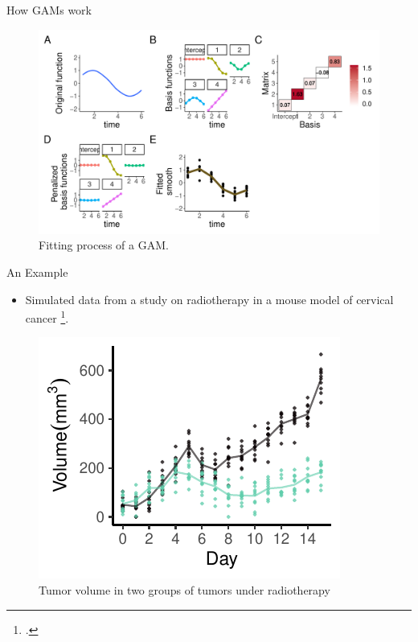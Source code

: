\documentclass[
  ignorenonframetext,
]{beamer}
\newif\ifbibliography
\providecommand{\tightlist}{%
  \setlength{\itemsep}{0pt}\setlength{\parskip}{0pt}}\usepackage{longtable,booktabs,array}
\begin{document}
\begin{frame}{How GAMs work}
\protect\hypertarget{how-gams-work}{}
\begin{figure}

{\centering \includegraphics{MfPH_Next_Generation_AM_March_2023_files/figure-beamer/basis-functions-plot-1.pdf}

}

\caption{Fitting process of a GAM.}

\end{figure}
\end{frame}

\begin{frame}{An Example}
\protect\hypertarget{an-example}{}
\begin{itemize}[<+->]
\tightlist
\item
  Simulated data from a study on radiotherapy in a mouse model of
  cervical cancer \footcite{zheng2019}.
\end{itemize}

\begin{figure}

{\centering \includegraphics{MfPH_Next_Generation_AM_March_2023_files/figure-beamer/simulated-data-1.pdf}

}

\caption{Tumor volume in two groups of tumors under radiotherapy}

\end{figure}
\end{frame}


\begin{frame}[allowframebreaks]{}
  \bibliographytrue
  \printbibliography[heading=none]
\end{frame}
\end{document}
